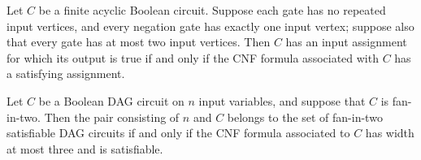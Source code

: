 \begin{theorem}
\label{BoolCircuit.DAGCircuit.satisfiable_iff_toCNF_satisfiable_of_isFaninTwo}
\leanok
{}
Let $C$ be a finite acyclic Boolean circuit. Suppose each gate has no repeated input
vertices, and every negation gate has exactly one input vertex; suppose also that every
gate has at most two input vertices. Then $C$ has an input assignment for which its
output is true if and only if the CNF formula associated with $C$ has a satisfying
assignment.
\end{theorem}

\begin{theorem}
\label{BoolCircuit.mem_dagCktSat_iff_toCNF}
\leanok
{}
Let $C$ be a Boolean DAG circuit on $n$ input variables, and suppose that $C$ is
fan-in-two. Then the pair consisting of $n$ and $C$ belongs to the set of fan-in-two
satisfiable DAG circuits if and only if the CNF formula associated to $C$ has width at
most three and is satisfiable.
\end{theorem}
